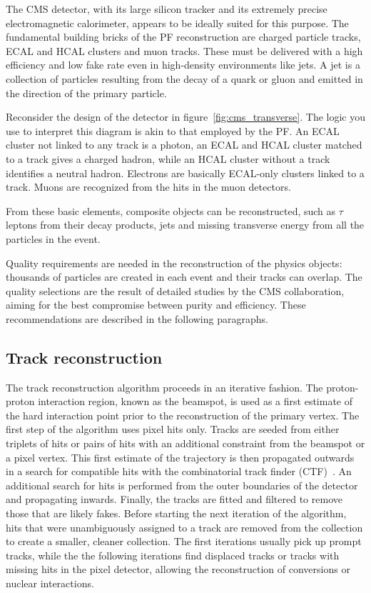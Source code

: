 The CMS detector, with its large silicon tracker and its extremely precise electromagnetic calorimeter, appears to be ideally suited for this purpose. The fundamental building bricks of the PF reconstruction are charged particle tracks, ECAL and HCAL clusters and muon tracks. These must be delivered with a high efficiency and low fake rate even in high-density environments like jets. A jet is a collection of particles resulting from the decay of a quark or gluon and emitted in the direction of the primary particle. 

Reconsider the design of the detector in figure~\ref{fig:cms_transverse}. The logic you use to
interpret this diagram is akin to that employed by the PF.
An ECAL cluster not linked to any track is a photon, an ECAL and HCAL
cluster matched to a track gives a charged hadron, while an HCAL cluster
without a track identifies a neutral hadron. Electrons are basically
ECAL-only clusters linked to a track. Muons are recognized from the hits in
the muon detectors.

From these basic elements, composite objects can be reconstructed, such as
$\tau$ leptons from their decay products, jets and
missing transverse energy from all the particles in the event.

Quality requirements are needed in the reconstruction of the physics
objects: thousands of particles are created in each event and their tracks
can overlap.
The quality selections are the result of detailed studies by the CMS
collaboration, aiming for the best compromise between purity and efficiency.
These recommendations are described in the following paragraphs.

\subsection{Track reconstruction}
The track reconstruction algorithm proceeds in an iterative fashion. The
proton-proton interaction region, known as the beamspot, is used as a first
estimate of the hard interaction point prior to the reconstruction of the
primary vertex.
The first step of the algorithm uses pixel hits only. Tracks are seeded from
either triplets of hits or pairs of hits with an additional constraint from
the beamspot or a pixel vertex. This first estimate of the trajectory is
then propagated outwards in a search for compatible hits with the
combinatorial track finder (CTF)~\cite{ctf}. An additional search for hits
is performed from the outer boundaries of the detector and propagating
inwards. Finally, the tracks are fitted and filtered to remove those that
are likely fakes. Before starting the next iteration of the algorithm, hits
that were unambiguously assigned to a track are removed from the collection
to create a smaller, cleaner collection.
The first iterations usually pick up prompt tracks, while the
the following iterations find displaced tracks or tracks with missing hits
in the pixel detector, allowing the reconstruction of conversions or nuclear
interactions.

